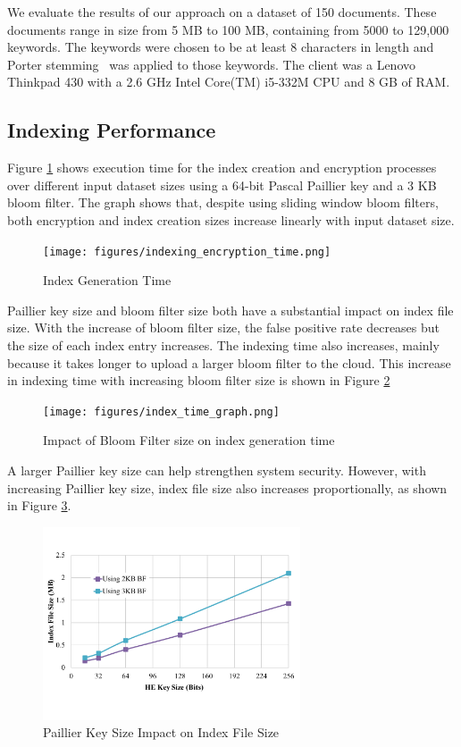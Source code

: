We evaluate the results of our approach on a dataset of 150 documents. 
These documents range in size from 5 MB to 100 MB, containing from 5000 to
129,000 keywords. The keywords were chosen to be at least 8 characters in
length and Porter stemming~\cite{porter} was applied to those keywords.
The client was a Lenovo Thinkpad 430 with a 2.6 GHz Intel Core(TM) i5-332M
CPU and 8 GB of RAM.

\subsection{Indexing Performance}
Figure \ref{fig:Index-Generation-Time} shows execution time for the index creation
and encryption 
processes over different input dataset sizes 
using a 64-bit Pascal Paillier key and a 3 KB bloom filter. The graph shows that,
despite using sliding window bloom filters, 
both encryption and index creation sizes increase linearly with input dataset size.

\begin{figure}[h!]
  \centering
  \texttt{[image: figures/indexing\_encryption\_time.png]}
  \caption{Index Generation Time}
  \label{fig:Index-Generation-Time}
\end{figure}

Paillier key size and bloom filter size both have a substantial impact on index file size. 
With the increase of bloom filter size, the false positive rate decreases but the size of each
index entry increases. The indexing time also increases, mainly because it takes longer
to upload a larger bloom filter to the cloud. 
This increase in indexing time with increasing bloom filter size 
is shown in Figure \ref{fig: bf-size-exe-time}

 \begin{figure}
  \centering
  \texttt{[image: figures/index\_time\_graph.png]}
  \caption{Impact of Bloom Filter size on index generation time}
  \label{fig: bf-size-exe-time}
\end{figure}

A larger Paillier key size can help strengthen system security. However, with
increasing Paillier key size, index file size also increases proportionally,
as shown in
Figure \ref{fig: pascal-size-exe-time}.

 \begin{figure}
  \centering
  \includegraphics[width= 3in]{figures/paillier_index_size_graph.png}
  \caption{Paillier Key Size Impact on Index File Size}
  \label{fig: pascal-size-exe-time}
\end{figure}

